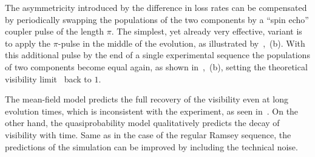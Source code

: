 The asymmetricity introduced by the difference in loss rates can be compensated by periodically swapping the populations of the two components by a ``spin echo'' coupler pulse of the length $\pi$.
The simplest, yet already very effective, variant is to apply the $\pi$-pulse in the middle of the evolution, as illustrated by~,~(b).
With this additional pulse by the end of a single experimental sequence the populations of two components become equal again, as shown in~,~(b), setting the theoretical visibility limit~ back to $1$.

The mean-field model predicts the full recovery of the visibility even at long evolution times, which is inconsistent with the experiment, as seen in~.
On the other hand, the quasiprobability model qualitatively predicts the decay of visibility with time.
Same as in the case of the regular Ramsey sequence, the predictions of the simulation can be improved by including the technical noise.

